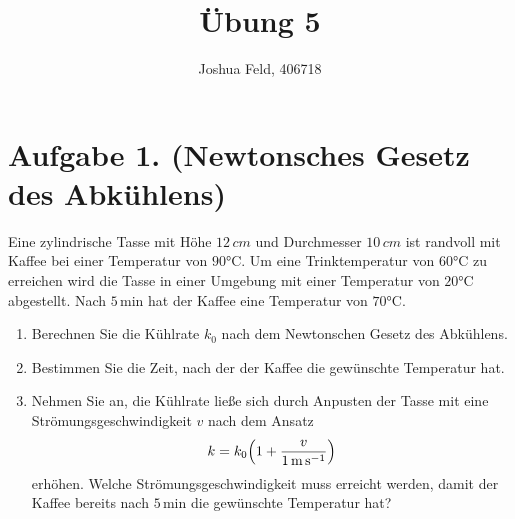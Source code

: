 \documentclass[german,12pt]{homework}
\title{Übung 5}
\author{Joshua Feld, 406718}
\institute{RWTH Aachen University\\Aachener Verfahrenstechnik}
\DeclarePairedDelimiter{\enbrace}{(}{)}
\begin{document}
    \maketitle

    \section*{Aufgabe 1. (Newtonsches Gesetz des Abkühlens)}

    \begin{problem}
        Eine zylindrische Tasse mit Höhe \(12\,\si{cm}\) und Durchmesser
        \(10\,\si{cm}\) ist randvoll mit Kaffee bei einer Temperatur von
        \(90\si{\degreeCelsius}\). Um eine Trinktemperatur von
        \(60\si{\degreeCelsius}\) zu erreichen wird die Tasse in einer Umgebung
        mit einer Temperatur von \(20\si{\degreeCelsius}\) abgestellt. Nach
        \(5\,\si{\minute}\) hat der Kaffee eine Temperatur von
        \(70\si{\degreeCelsius}\).
        \begin{enumerate}
            \item Berechnen Sie die Kühlrate \(k_0\) nach dem Newtonschen
            Gesetz des Abkühlens.
            \item Bestimmen Sie die Zeit, nach der der Kaffee die gewünschte
            Temperatur hat.
            \item Nehmen Sie an, die Kühlrate ließe sich durch Anpusten der
            Tasse mit eine Strömungsgeschwindigkeit \(v\) nach dem Ansatz
            \[k = k_0\enbrace*{1 + \frac{v}{1\,\si{\metre\per\second}}}\]
            erhöhen. Welche Strömungsgeschwindigkeit muss erreicht werden,
            damit der Kaffee bereits nach \(5\,\si{\minute}\) die gewünschte
            Temperatur hat?
        \end{enumerate}
    \end{problem}
\end{document}
